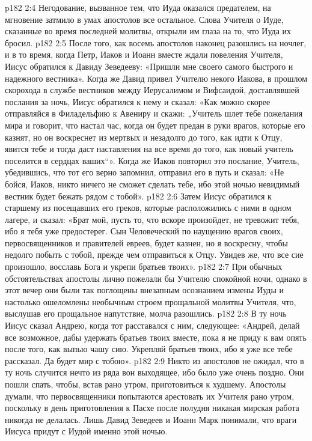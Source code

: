 \vs p182 2:4 Негодование, вызванное тем, что Иуда оказался предателем, на мгновение затмило в умах апостолов все остальное. Слова Учителя о Иуде, сказанные во время последней молитвы, открыли им глаза на то, что Иуда их бросил.
\vs p182 2:5 \pc После того, как восемь апостолов наконец разошлись на ночлег, и в то время, когда Петр, Иаков и Иоанн вместе ждали повеления Учителя, Иисус обратился к Давиду Зеведееву: «Пришли мне своего самого быстрого и надежного вестника». Когда же Давид привел Учителю некого Иакова, в прошлом скорохода в службе вестников между Иерусалимом и Вифсаидой, доставлявшей послания за ночь, Иисус обратился к нему и сказал: «Как можно скорее отправляйся в Филадельфию к Авениру и скажи: „Учитель шлет тебе пожелания мира и говорит, что настал час, когда он будет предан в руки врагов, которые его казнят, но он воскреснет из мертвых и незадолго до того, как идти к Отцу, явится тебе и тогда даст наставления на все время до того, как новый учитель поселится в сердцах ваших“». Когда же Иаков повторил это послание, Учитель, убедившись, что тот его верно запомнил, отправил его в путь и сказал: «Не бойся, Иаков, никто ничего не сможет сделать тебе, ибо этой ночью невидимый вестник будет бежать рядом с тобой».
\vs p182 2:6 Затем Иисус обратился к старшему из посещавших его греков, которые расположились с ними в одном лагере, и сказал: «Брат мой, пусть то, что вскоре произойдет, не тревожит тебя, ибо я тебя уже предостерег. Сын Человеческий по наущению врагов своих, первосвященников и правителей евреев, будет казнен, но я воскресну, чтобы недолго побыть с тобой, прежде чем отправиться к Отцу. Увидев же, что все сие произошло, восславь Бога и укрепи братьев твоих».
\vs p182 2:7 \pc При обычных обстоятельствах апостолы лично пожелали бы Учителю спокойной ночи, однако в этот вечер они были так поглощены внезапным осознанием измены Иуды и настолько ошеломлены необычным строем прощальной молитвы Учителя, что, выслушав его прощальное напутствие, молча разошлись.
\vs p182 2:8 В ту ночь Иисус сказал Андрею, когда тот расставался с ним, следующее: «Андрей, делай все возможное, дабы удержать братьев твоих вместе, пока я не приду к вам опять после того, как выпью чашу сию. Укрепляй братьев твоих, ибо я уже все тебе рассказал. Да будет мир с тобою».
\vs p182 2:9 Никто из апостолов не ожидал, что в ту ночь случится нечто из ряда вон выходящее, ибо было уже очень поздно. Они пошли спать, чтобы, встав рано утром, приготовиться к худшему. Апостолы думали, что первосвященники попытаются арестовать их Учителя рано утром, поскольку в день приготовления к Пасхе после полудня никакая мирская работа никогда не делалась. Лишь Давид Зеведеев и Иоанн Марк понимали, что враги Иисуса придут с Иудой именно этой ночью.
